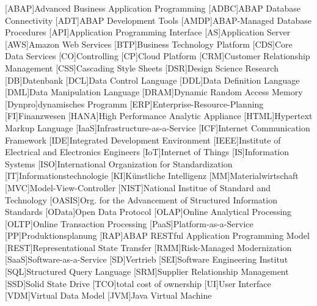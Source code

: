 

	\begin{acronym}[XXXXXXX]
		{Advanced Business Application Programming}
		{ABAP Database Connectivity}
		[ADT]{ABAP Development Tools}
		{ABAP-Managed Database Procedures}
		[API]{Application Programming Interface}
		[AS]{Application Server}
		[AWS]{Amazon Web Services}
		[BTP]{Business Technology Platform}
		[CDS]{Core Data Services}
		[CO]{Controlling}
		[CP]{Cloud Platform}
		[CRM]{Customer Relationship Management}
		[CSS]{Cascading Style Sheets}
		[DSR]{Design Science Research}
		[DB]{Datenbank}
		[DCL]{Data Control Language}
		[DDL]{Data Definition Language}
		[DML]{Data Manipulation Language}
		{Dynamic Random Access Memory}
		[Dynpro]{dynamisches Programm}
		[ERP]{Enterprise-Resource-Planning}
		[FI]{Finanzwesen}
		{High Performance Analytic Appliance}
		{Hypertext Markup Language}
		{Infrastructure-as-a-Service}
		[ICF]{Internet Communication Framework}
		[IDE]{Integrated Development Environment}
		{Institute of Electrical and Electronics Engineers}
		[IoT]{Internet of Things}
		[IS]{Information Systems}
		[ISO]{International Organization for Standardization}
		[IT]{Informationstechnologie}
		[KI]{Künstliche Intelligenz}
		[MM]{Materialwirtschaft}
		[MVC]{Model-View-Controller}
		{National Institue of Standard and Technology}
		[OASIS]{Org. for the Advancement of Structured Information Standards}
		[OData]{Open Data Protocol}
		{Online Analytical Processing}
		{Online Transaction Processing}
		{Platform-as-a-Service}
		[PP]{Produktionsplanung}
		[RAP]{ABAP RESTful Application Programming Model}
		{Representational State Transfer}
		[RMM]{Risk-Managed Modernization}
		{Software-as-a-Service}
		[SD]{Vertrieb}
		[SEI]{Software Engineering Institut}
		[SQL]{Structured Query Language}
		[SRM]{Supplier Relationship Management}
		[SSD]{Solid State Drive}
		[TCO]{total cost of ownership}
		[UI]{User Interface}
		[VDM]{Virtual Data Model}
		[JVM]{Java Virtual Machine}


\end{acronym}

